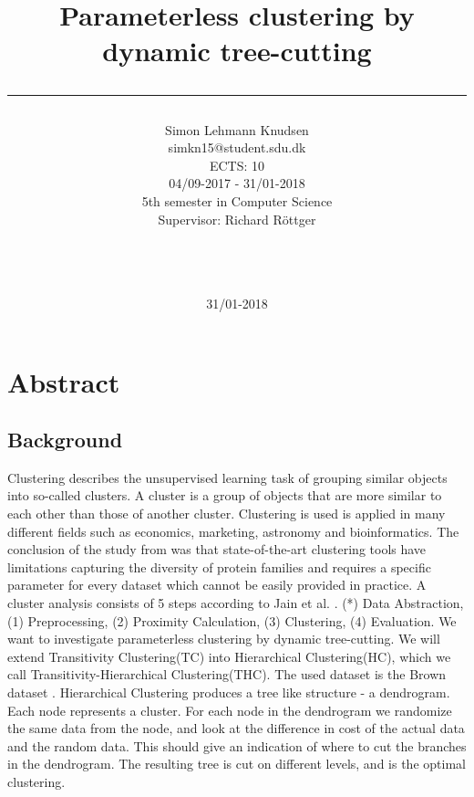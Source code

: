 \documentclass[a4paper,10pt]{article}
\title{ Parameterless clustering by dynamic tree-cutting \rule{10cm}{0.5mm}}
\author{Simon Lehmann Knudsen \\
	simkn15@student.sdu.dk \\
	ECTS: 10 \\
	04/09-2017 - 31/01-2018 \\
	5th semester in Computer Science \\
	Supervisor: Richard Röttger
\\\rule{5.5cm}{0.5mm}\\}
\date{31/01-2018}
\theoremstyle{plain}
\theoremstyle{definition}
\begin{document}
\maketitle

\newpage
\tableofcontents

\newpage
\section*{Abstract}

\subsection*{Background}
Clustering describes the unsupervised learning task of grouping similar objects into so-called clusters. A cluster is a group of objects that are more similar to each other than those of another cluster. Clustering is used is applied in many different fields such as economics, marketing, astronomy and bioinformatics. The conclusion of the study from \cite{powerLimits} was that state-of-the-art clustering tools have limitations capturing the diversity of protein families and requires a specific parameter for every dataset which cannot be easily provided in practice. A cluster analysis consists of 5 steps according to Jain et al. \cite{19overview}. (*) Data Abstraction, (1) Preprocessing, (2) Proximity Calculation, (3) Clustering, (4) Evaluation. We want to investigate parameterless clustering by dynamic tree-cutting. We will extend Transitivity Clustering(TC) into Hierarchical Clustering(HC), which we call Transitivity-Hierarchical Clustering(THC). The used dataset is the Brown dataset \cite{brown}. Hierarchical Clustering produces a tree like structure - a dendrogram. Each node represents a cluster. For each node in the dendrogram we randomize the same data from the node, and look at the difference in cost of the actual data and the random data. This should give an indication of where to cut the branches in the dendrogram. The resulting tree is cut on different levels, and is the optimal clustering. 
\end{document}
